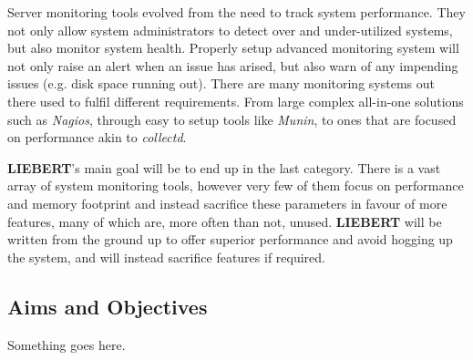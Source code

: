 \documentclass[12pt,a4paper,table]{article}
\begin{document}
            Server monitoring tools evolved from the need to track system performance. They not only allow system administrators to detect over and under-utilized systems, but also monitor system health. Properly setup advanced monitoring system will not only raise an alert when an issue has arised, but also warn of any impending issues (e.g. disk space running out). There are many monitoring systems out there used to fulfil different requirements. From large complex all-in-one solutions such as \textit{Nagios}, through easy to setup tools like \textit{Munin}, to ones that are focused on performance akin to \textit{collectd}.

            \textbf{LIEBERT}'s main goal will be to end up in the last category. There is a vast array of system monitoring tools, however very few of them focus on performance and memory footprint and instead sacrifice these parameters in favour of more features, many of which are, more often than not, unused. \textbf{LIEBERT} will be written from the ground up to offer superior performance and avoid hogging up the system, and will instead sacrifice features if required.


        \subsection{Aims and Objectives}
            Something goes here.
\end{document}
